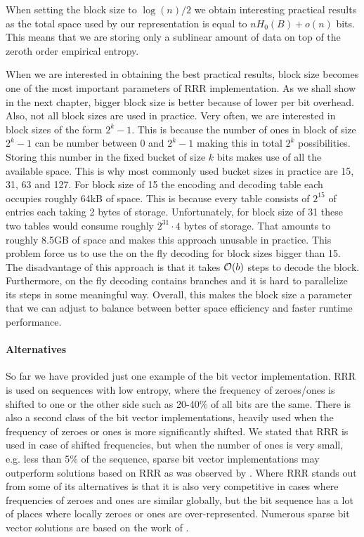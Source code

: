 When setting the block size to $\log(n)/2$ we obtain interesting practical results as
the total space used by our representation is equal to $nH_0(B) + o(n)$ bits. This means
that we are storing only a sublinear amount of data on top of the zeroth order empirical entropy.

When we are interested in obtaining the best practical results, block size becomes
one of the most important parameters of RRR implementation. As we shall show in the next
chapter, bigger block size is better because of lower per bit overhead. Also, not all block
sizes are used in practice. Very often, we are interested in block sizes of the form $2^k-1$.
This is because the number of ones in block of size $2^k-1$ can be number between 0 and $2^k-1$
making this in total $2^k$ possibilities. Storing this number in the fixed bucket of size
$k$ bits makes use of all the available space. This is why most commonly used bucket sizes in
practice are 15, 31, 63 and 127. For block size of 15 the encoding and decoding table
each occupies roughly 64kB of space. This is because every table consists of $2^{15}$ of entries
each taking 2 bytes of storage. Unfortunately, for block size of 31 these two tables would consume
roughly $2^{31}\cdot 4$ bytes of storage. That amounts to roughly 8.5GB of space and makes this approach
unusable in practice. This problem force us to use the on the fly decoding for block sizes
bigger than 15. The disadvantage of this approach is that it takes $\mathcal{O}(b)$ steps to decode the block.
Furthermore, on the fly decoding contains branches and it is hard to parallelize its steps in some meaningful
way. Overall, this makes the block size a parameter that we can adjust to balance between better space
efficiency and faster runtime performance.

\paragraph{Alternatives}

So far we have provided just one example of the bit vector implementation.
RRR is used on sequences with low entropy, where the frequency of zeroes/ones
is shifted to one or the other side such as 20-40\% of all bits are the same.
There is also a second class of the bit vector implementations, heavily
used when the frequency of zeroes or ones is more significantly shifted.
We stated that RRR is used in case of shifted frequencies, but when the number
of ones is very small, e.g. less than 5\% of the sequence, sparse bit vector
implementations may outperform solutions based on RRR as was observed by \cite{navarro2012fast}.
Where RRR stands out from some of its alternatives is that it is also very competitive
in cases where frequencies of zeroes and ones are similar globally, but the bit
sequence has a lot of places where locally zeroes or ones are over-represented.
Numerous sparse bit vector solutions are based on the work of \cite{okanohara2007practical}.